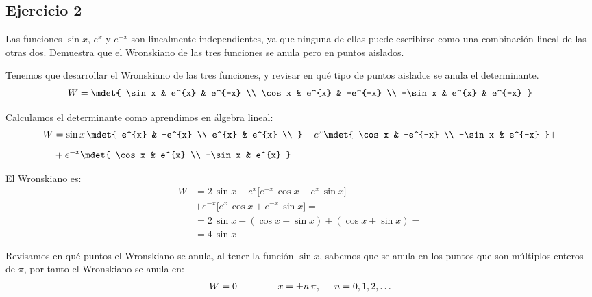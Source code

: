 \subsection{Ejercicio 2}

\begin{ejemplo}
Las funciones $\sin x$, $e^{x}$ y $e^{-x}$ son linealmente independientes, ya que ninguna de ellas puede escribirse como una combinación lineal de las otras dos. Demuestra que el Wronskiano de las tres funciones se anula pero en puntos aislados.
\par
Tenemos que desarrollar el Wronskiano de las tres funciones, y revisar en qué tipo de puntos aislados se anula el determinante.
\begin{align*}
W = \mdet{
\sin x & e^{x} & e^{-x} \\
\cos x & e^{x} & -e^{-x} \\
-\sin x & e^{x} & e^{-x}
}
\end{align*}

Calculamos el determinante como aprendimos en álgebra lineal:
\begin{align*}
W &= \sin x \, \mdet{
e^{x} & -e^{x} \\
e^{x} & e^{x} \\
} - e^{x} \mdet{
\cos x & -e^{-x} \\
-\sin x & e^{-x}
} + \\[0.5em]
&+e^{-x} \mdet{
\cos x & e^{x} \\
-\sin x & e^{x}
}
\end{align*}

El Wronskiano es:
\begin{align*}
W &= 2 \, \sin x - e^{x} \bigg[ e^{-x} \, \cos x - e^{x} \, \sin x \bigg] \\[0.5em]
&+ e^{-x} \bigg[ e^{x} \, \cos x + e^{-x} \, \sin x \bigg] = \\[0.5em] 
&= 2 \, \sin x - (\cos x -\sin x) + (\cos x + \sin x) = \\[0.5em] 
&= 4 \, \sin x
\end{align*}

Revisamos en qué puntos el Wronskiano se anula, al tener la función $\sin x$, sabemos que se anula en los puntos que son múltiplos enteros de $\pi$, por tanto el Wronskiano se anula en:
\begin{align*}
W = 0 \hspace{1.5cm} x = \pm n \, \pi, \hspace{0.5cm} n = 0, 1, 2, \ldots
\end{align*}
\end{ejemplo}

